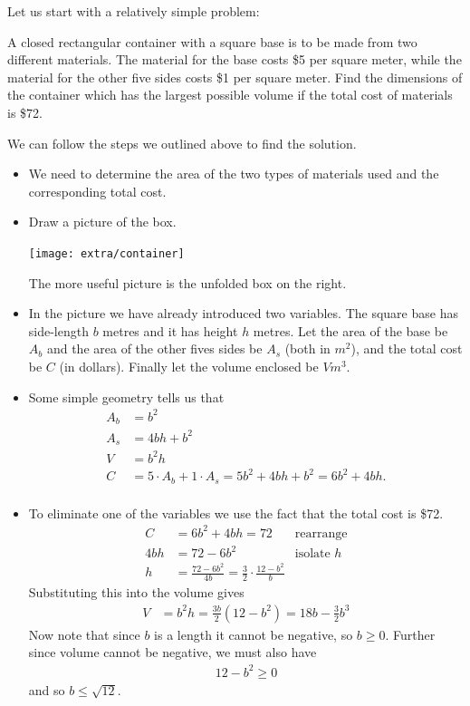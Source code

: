 Let us start with a relatively simple problem:
\begin{eg}\label{APPglobalMaxMinB}
A closed rectangular container with a square base is to be made
from two different materials. The material for the base costs \$5 per square
meter, while the material for the other five sides costs \$1 per square
meter. Find the dimensions of the container which has the largest possible
volume if the total cost of materials is \$72.

\soln We can follow the steps we outlined above to find the solution.
\begin{itemize}
 \item We need to determine the area of the two types of materials used and the
corresponding total cost.
 \item Draw a picture of the box.
\begin{efig}
\centering
 \texttt{[image: extra/container]}
\end{efig}
The more useful picture is the unfolded box on the right.
\item In the picture we have already introduced two variables. The square base has
side-length $b$ metres and it has height $h$ metres. Let the area of the base be $A_b$
and the area of the other fives sides be $A_s$ (both in $m^2$), and the total cost be
$C$ (in dollars). Finally let the volume enclosed be $V m^3$.
\item Some simple geometry tells us that
\begin{align*}
  A_b &= b^2 \\
  A_s &= 4 bh + b^2 \\
  V &= b^2h\\
  C &= 5 \cdot A_b + 1\cdot A_s = 5b^2+4bh+b^2 = 6b^2+4bh.\\
\end{align*}
\item To eliminate one of the variables we use the fact that the total cost is \$72.
\begin{align*}
  C &= 6b^2+4bh = 72 & \text{rearrange}\\
  4bh &= 72-6b^2  & \text{isolate $h$}\\
  h &= \frac{72-6b^2}{4b} = \frac{3}{2} \cdot \frac{12-b^2}{b}
\end{align*}
Substituting this into the volume gives
\begin{align*}
  V&= b^2 h = \frac{3b}{2} (12-b^2) = 18b - \frac{3}{2} b^3
\end{align*}
Now note that since $b$ is a length it cannot be negative, so $b \geq 0$. Further since
volume cannot be negative, we must also have
\begin{align*}
  12-b^2 \geq 0
\end{align*}
and so $b \leq \sqrt{12}$.


\end{itemize}
\end{eg}
